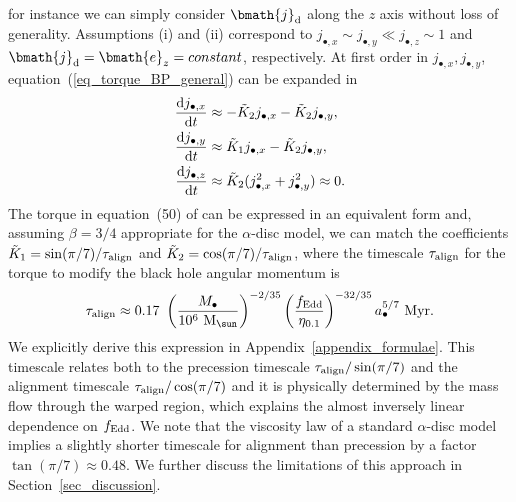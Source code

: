 \documentclass[a4paper,fleqn,usenatbib]{mnras}
\begin{document}
for instance we can simply consider $\bmath{j}_{\rm d}$ along the $z$ axis without loss of generality.
Assumptions (i) and (ii) correspond to $j_{\bullet, x} \sim j_{\bullet, y} \ll j_{\bullet, z} \sim 1$ and $\bmath{j}_{\rm d} = \bmath{e}_{z} = constant$, respectively.
At first order in $j_{\bullet, x}, j_{\bullet, y}$, equation~(\ref{eq_torque_BP_general}) can be expanded in  
\begin{equation}
\begin{aligned}
\frac{{\rm d}j_{\bullet, x}}{{\rm d}t} & \approx -\tilde{K}_{2} j_{\bullet, x} - \tilde{K}_{2} j_{\bullet, y}, \\
\frac{{\rm d}j_{\bullet, y}}{{\rm d}t} & \approx \tilde{K}_{1} j_{\bullet, x} - \tilde{K}_{2} j_{\bullet, y}, \\
\frac{{\rm d}j_{\bullet, z}}{{\rm d}t} & \approx \tilde{K}_{2} (j_{\bullet, x}^2 + j_{\bullet, y}^2) \approx 0.
\end{aligned}
\end{equation}
The torque in equation~(50) of \citet{martin+07} can be expressed in an equivalent form and, assuming $\beta = 3/4$ appropriate for the $\alpha$-disc model, we can match the coefficients $\tilde{K}_{1} = \sin(\pi/7) / \tau_{\rm align}$ and $\tilde{K}_{2} = \cos(\pi/7) / \tau_{\rm align}$, where the timescale $\tau_{\rm align}$ for the torque to modify the black hole angular momentum is \citep{martin+07, perego+09, dotti+13}
\begin{equation} \label{eq_t_align}
\tau_{\rm align} \approx 0.17~\left( \frac{M_{\bullet}}{10^6~{\rm M}_{\sun}} \right)^{-2/35} \left( \frac{f_{\rm Edd}}{\eta_{0.1}} \right)^{-32/35} a_{\bullet}^{5/7}~{\rm Myr}.
\end{equation}
We explicitly derive this expression in Appendix~\ref{appendix_formulae}.
This timescale relates both to the precession timescale $\tau_{\rm align}/\sin(\pi/7)$ and the alignment timescale $\tau_{\rm align}/\cos(\pi/7)$ and it is physically determined by the mass flow through the warped region, which explains the almost inversely linear dependence on $f_{\rm Edd}$.
We note that the viscosity law of a standard $\alpha$-disc model implies a slightly shorter timescale for alignment than precession by a factor $\tan(\pi/7) \approx 0.48$. 
We further discuss the limitations of this approach in Section~\ref{sec_discussion}. 
\end{document}

